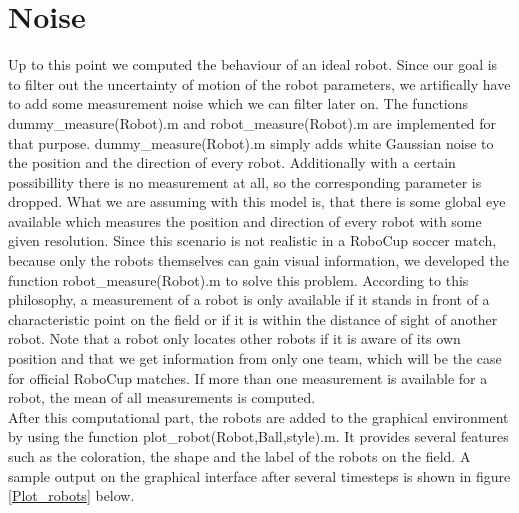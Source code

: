 \section{Noise}
Up to this point we computed the behaviour of an ideal robot. Since our goal is to filter out the uncertainty of motion of the robot parameters, we artifically have to add some measurement noise which we can filter later on. The functions {\selectfont dummy\_measure(Robot).m} and {\selectfont robot\_measure(Robot).m} are implemented for that purpose. {\selectfont dummy\_measure(Robot).m} simply adds white Gaussian noise to the position and the direction of every robot. Additionally with a certain possibillity there is no measurement at all, so the corresponding parameter is dropped. What we are assuming with this model is, that there is some global eye available which measures the position and direction of every robot with some given resolution. Since this scenario is not realistic in a RoboCup soccer match, because only the robots themselves can gain visual information, we developed the function {\selectfont robot\_measure(Robot).m} to solve this problem. According to this philosophy, a measurement of a robot is only available if it stands in front of a characteristic point on the field or if it is within the distance of sight of another robot. Note that a robot only locates other robots if it is aware of its own position and that we get information from only one team, which will be the case for official RoboCup matches. If more than one measurement is available for a robot, the mean of all measurements is computed.\\

After this computational part, the robots are added to the graphical environment by using the function
{\selectfont plot\_robot(Robot,Ball,style).m}. It provides several features such as the coloration, the shape and the label of the robots on the field. A sample output on the graphical interface after several timesteps is shown in figure \ref{Plot_robots} below.


